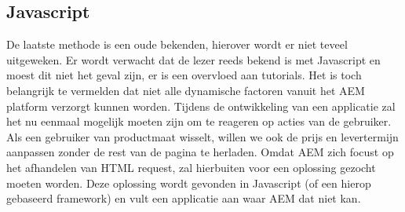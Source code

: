\documentclass{article}
\begin{document}
	\subsection{Javascript}
     De laatste methode is een oude bekenden, hierover wordt er niet teveel uitgeweken. Er wordt verwacht dat de lezer reeds bekend is met Javascript en moest dit niet het geval zijn, er is een overvloed aan tutorials. Het is toch belangrijk te vermelden dat niet alle dynamische factoren vanuit het AEM platform verzorgt kunnen worden. Tijdens de ontwikkeling van een applicatie zal het nu eenmaal mogelijk moeten zijn om te reageren op acties van de gebruiker. Als een gebruiker van productmaat wisselt, willen we ook de prijs en levertermijn aanpassen zonder de rest van de pagina te herladen. Omdat AEM zich focust op het afhandelen van HTML request, zal hierbuiten voor een oplossing gezocht moeten worden. Deze oplossing wordt gevonden in Javascript (of een hierop gebaseerd framework) en vult een applicatie aan waar AEM dat niet kan.
\end{document}
